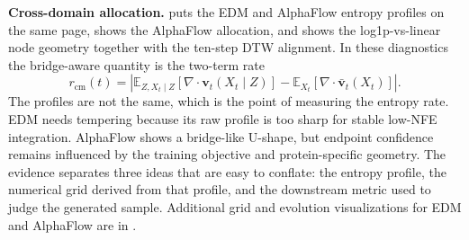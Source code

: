 \documentclass{article}
\newcommand{\E}{\mathbb{E}}
\newcommand{\vv}{\bm{v}}
\newcommand{\cm}{\mathrm{cm}}
\newcommand{\diver}{\nabla\!\cdot}
\theoremstyle{plain}
\theoremstyle{definition}
\theoremstyle{remark}
\begin{document}
    \textbf{Cross-domain allocation.}  puts the EDM and AlphaFlow entropy profiles on the same page,  shows the AlphaFlow allocation, and  shows the log1p-vs-linear node geometry together with the ten-step DTW alignment. In these diagnostics the bridge-aware quantity is the two-term rate
\begin{equation}
  r_{\cm}(t)
  =
  \left|
  \E_{Z,X_t\mid Z}\!\left[\diver\vv_t(X_t\mid Z)\right]
  -
  \E_{X_t}\!\left[\diver\bar{\vv}_t(X_t)\right]
  \right|.
  \label{eq:results_cm_rate}
\end{equation}
The profiles are not the same, which is the point of measuring the entropy rate. EDM needs tempering because its raw profile is too sharp for stable low-NFE integration. AlphaFlow shows a bridge-like U-shape, but endpoint confidence remains influenced by the training objective and protein-specific geometry. The evidence separates three ideas that are easy to conflate: the entropy profile, the numerical grid derived from that profile, and the downstream metric used to judge the generated sample. Additional grid and evolution visualizations for EDM and AlphaFlow are in .

\end{document}
